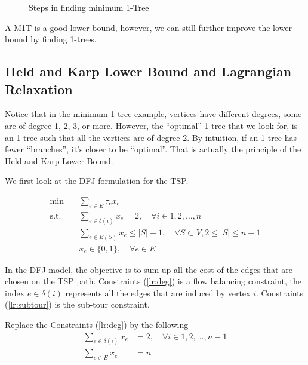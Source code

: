             \begin{figure}[!htp]
                \centering                
                \quad
                \quad
                \caption{Steps in finding minimum 1-Tree}
                \label{fig:1tree}
            \end{figure}

            A M1T is a good lower bound, however, we can still further improve the lower bound by finding 1-trees.

        \subsection{Held and Karp Lower Bound and Lagrangian Relaxation}
            Notice that in the minimum 1-tree example, vertices have different degrees, some are of degree 1, 2, 3, or more. However, the ``optimal'' 1-tree that we look for, is an 1-tree such that all the vertices are of degree 2. By intuition, if an 1-tree has fewer ``branches'', it's closer to be ``optimal''. That is actually the principle of the Held and Karp Lower Bound.

            We first look at the DFJ formulation for the TSP.

            \begin{align}
                \min \quad &\sum_{e \in E} \tau_e x_e \label{lr:obj}\\
                \text{s.t.} \quad & \sum_{e \in \delta(i)} x_e = 2, \quad \forall i \in 1, 2, \ldots, n\label{lr:deg}\\
                & \sum_{e \in E(S)} x_e \le |S| - 1, \quad \forall S \subset V, 2 \le |S| \le n - 1 \label{lr:subtour}\\
                & x_e \in \{0, 1\}, \quad \forall e \in E
            \end{align}

            In the DFJ model, the objective is to sum up all the cost of the edges that are chosen on the TSP path. Constraints (\ref{lr:deg}) is a flow balancing constraint, the index $e\in \delta(i)$ represents all the edges that are induced by vertex $i$. Constraints (\ref{lr:subtour}) is the sub-tour constraint.

            Replace the Constraints (\ref{lr:deg}) by the following
            \begin{align}
                \sum_{e \in \delta(i)} x_e &= 2, \quad \forall i \in 1, 2, \ldots, n - 1\\
                \sum_{e \in E} x_e &= n
            \end{align}

